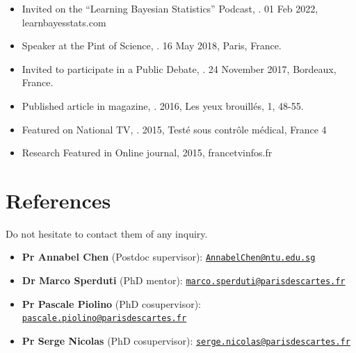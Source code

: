 \documentclass[11pt,a4paper,]{awesome-cv}
\providecommand{\tightlist}{%
	\setlength{\itemsep}{0pt}\setlength{\parskip}{0pt}}
\begin{document}
\begin{itemize}
\tightlist
\item
  Invited on the ``Learning Bayesian Statistics'' Podcast,
  \href{https://www.learnbayesstats.com/episode/55-neuropsychology-illusions-bending-reality-dominique-makowski}{\color[HTML]{1976D2}{\#55 Neuropsychology, Illusions \& Bending Reality, with Dominique Makowski}}.
  01 Feb 2022, learnbayesstats.com
\item
  Speaker at the Pint of Science,
  \href{https://pintofscience.com/}{\color[HTML]{1976D2}{Back to the Matrix : pilule bleue ou rouge ?}}.
  16 May 2018, Paris, France.
\item
  Invited to participate in a Public Debate,
  \href{https://facts2017.u-bordeaux.fr/FESTIVAL/Programme/Agenda-2017/Rencards-du-savoir-Les-illusions-sensorielles.html}{\color[HTML]{1976D2}{Art \& science discussion on sensory illusions}}.
  24 November 2017, Bordeaux, France.
\item
  Published article in magazine,
  \href{https://biblineuropsy.com/2016/04/19/les-yeux-brouilles/}{\color[HTML]{1976D2}{Neuroanatomie de la réalité : quand le réel n'est plus}}.
  2016, Les yeux brouillés, 1, 48-55.
\item
  Featured on National TV,
  \href{https://www.youtube.com/watch?v=ihGs1V9kz4w}{\color[HTML]{1976D2}{The effect of violent images on the brain and body}}.
  2015, Testé sous contrôle médical, France 4
\item
  Research Featured in Online journal,
  \href{(http://blog.francetvinfo.fr/actu-cine/2015/05/07/avengers-lere-dultron-en-3d-aussitot-vu-aussitot-oublie.html}{\color[HTML]{1976D2}{”Avengers, l'ère d’Ultron” en 3D : aussitôt vu, aussitôt oublié ?}}
  2015, francetvinfos.fr
\end{itemize}

\normalsize

\section{References}\label{references}

\small

Do not hesitate to contact them of any inquiry.

\begin{itemize}
\tightlist
\item
  \textbf{Pr Annabel Chen} (Postdoc supervisor):
  \href{mailto:AnnabelChen@ntu.edu.sg}{\nolinkurl{AnnabelChen@ntu.edu.sg}}
\item
  \textbf{Dr Marco Sperduti} (PhD mentor):
  \href{mailto:marco.sperduti@parisdescartes.fr}{\nolinkurl{marco.sperduti@parisdescartes.fr}}
\item
  \textbf{Pr Pascale Piolino} (PhD cosupervisor):
  \href{mailto:pascale.piolino@parisdescartes.fr}{\nolinkurl{pascale.piolino@parisdescartes.fr}}
\item
  \textbf{Pr Serge Nicolas} (PhD cosupervisor):
  \href{mailto:serge.nicolas@parisdescartes.fr}{\nolinkurl{serge.nicolas@parisdescartes.fr}}
\end{itemize}

\normalsize


\label{LastPage}~
\end{document}
